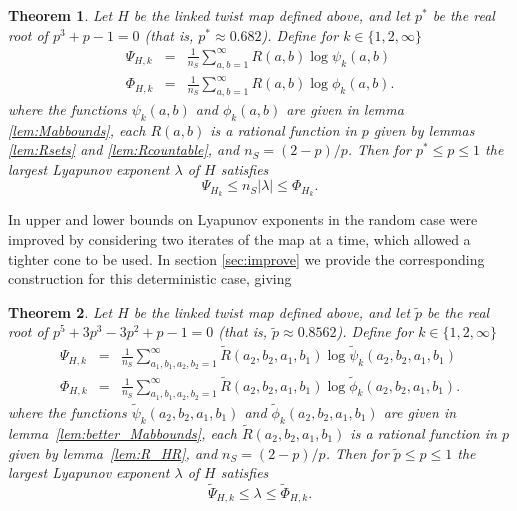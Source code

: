 \documentclass{iopart}
\newtheorem{theorem}{Theorem}
\begin{document}
\begin{theorem}\label{thm:simple_bounds}
Let $H$ be the linked twist map defined above, and let $p^*$ be the real root of $p^3+p-1=0$ (that is, $p^* \approx 0.682$). Define for $k \in \{ 1,2, \infty\}$
\begin{eqnarray}
\Psi_{H,k} &=& \frac{1}{n_S} \sum_{a,b = 1}^\infty R(a,b) \log \psi_k (a,b)\\
\Phi_{H,k} &=& \frac{1}{n_S} \sum_{a,b = 1}^\infty R(a,b) \log \phi_k (a,b).
\end{eqnarray}
where the functions $\psi_k (a,b)$ and $\phi_k (a,b)$ are given in lemma \ref{lem:Mabbounds}, each $R(a,b)$ is a rational function in $p$ given by lemmas \ref{lem:Rsets} and \ref{lem:Rcountable}, and $n_S = (2-p)/p$.  Then for $p^* \le p \le 1$ the largest Lyapunov exponent $\lambda$ of $H$ satisfies
\begin{equation}\label{eq:le_bounds}
\Psi_{H_k}  \le n_S |\lambda| \le \Phi_{H_k}.
\end{equation}
  

\end{theorem}

In \cite{sturman2019lyapunov} upper and lower bounds on Lyapunov exponents in the random case were improved by considering two iterates of the map at a time, which allowed a tighter cone to be used. In section \ref{sec:improve} we provide the corresponding construction for this deterministic case, giving
\begin{theorem}\label{thm:better_bounds}
Let $H$ be the linked twist map defined above, and let $\tilde{p}$ be the real root of $p^5+3p^3-3p^2+p-1=0$ (that is, $\tilde{p} \approx 0.8562$). Define for $k \in \{ 1,2, \infty\}$
\begin{eqnarray}
\Psi_{H,k} &=& \frac{1}{n_S} \sum_{a_1,b_1,a_2,b_2 = 1}^\infty \tilde{R}(a_2,b_2,a_1,b_1) \log \tilde{\psi}_k (a_2,b_2,a_1,b_1)\\
\Phi_{H,k} &=& \frac{1}{n_S} \sum_{a_1,b_1,a_2,b_2 = 1}^\infty \tilde{R}(a_2,b_2,a_1,b_1) \log \tilde{\phi}_k (a_2,b_2,a_1,b_1).
\end{eqnarray}
where the functions $\tilde{\psi}_k (a_2,b_2,a_1,b_1) $ and $\tilde{\phi}_k (a_2,b_2,a_1,b_1)$ are given in lemma~\ref{lem:better_Mabbounds}, each $\tilde{R}(a_2,b_2,a_1,b_1)$ is a 
rational function in $p$ given by lemma~\ref{lem:R_HR}, and $n_S = (2-p)/p$.  Then for $\tilde{p} \le p \le 1$ the largest Lyapunov exponent $\lambda$ of $H$ satisfies
\begin{equation}\label{eq:le_bounds}
\tilde{\Psi}_{H,k}  \le \lambda \le \tilde{\Phi}_{H,k}.
\end{equation}
\end{theorem}
\end{document}

